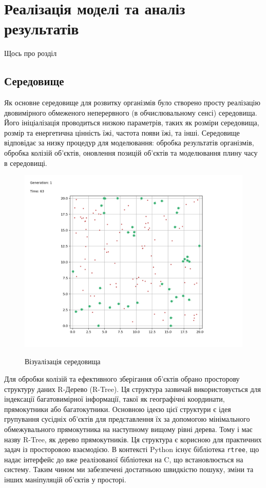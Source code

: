 \chapter{Реалізація моделі та аналіз результатів}
\label{chap:practice}

Щось про розділ




\section{Середовище}

Як основне середовище для розвитку організмів було створено 
просту реалізацію двовимірного обмеженого неперервного 
(в обчислювальному сенсі) середовища. 
Його ініціалізація проводиться низкою параметрів, 
таких як розміри середовища, розмір та енергетична цінність їжі, 
частота появи їжі, та інші. 
Середовище відповідає за низку процедур для моделювання: 
обробка результатів організмів, обробка колізій об’єктів, 
оновлення позицій об’єктів та моделювання плину часу в середовищі.


\begin{figure}[ht]
  \centering
  \caption{Візуалізація середовища}
  \includegraphics[scale=0.5]{Images/visualizing-the-environment.png}
  \label{fig:візуалізація-середовища}
\end{figure}


Для обробки колізій та ефективного зберігання об’єктів обрано 
просторову структуру даних R-Дерево (R-Tree). 
Ця структура зазвичай використовується для індексації 
багатовимірної інформації, такої як географічні координати, 
прямокутники або багатокутники.
Основною ідеєю цієї структури є ідея групування сусідніх 
об’єктів для представлення їх за допомогою мінімального 
обмежувального прямокутника на наступному вищому рівні дерева. 
Тому і має назву R-Tree, як дерево прямокутників.
Ця структура є корисною для практичних задач із просторовою взаємодією. 
В контексті Python існує бібліотека \verb+rtree+, 
що надає інтерфейс до вже реалізованої бібліотеки на C, 
що встановлюється на систему. 
Таким чином ми забезпечені достатньою швидкістю пошуку, 
зміни та інших маніпуляцій об’єктів у просторі.


